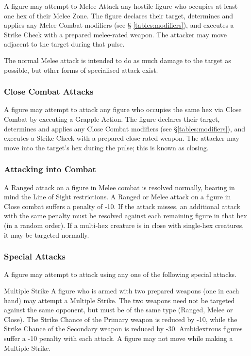 \begin{multicols*}{3}
A figure may attempt to Melee Attack any hostile figure who occupies
at least one hex of their Melee Zone. The figure declares their
target, determines and applies any Melee Combat modifiers (see \S
\ref{tables:modifiers}), and executes a Strike Check with a prepared
melee-rated weapon. The attacker may move adjacent to the target
during that pulse.

The normal Melee attack is intended to do as much damage to the target
as possible, but other forms of specialised attack exist.

\subsubsection{Close Combat Attacks}

A figure may attempt to attack any figure who occupies the same hex
via Close Combat by executing a Grapple Action. The figure declares
their target, determines and applies any Close Combat modifiers (see
\S \ref{tables:modifiers}), and executes a Strike Check with a
prepared close-rated weapon. The attacker may move into the target's
hex during the pulse; this is known as closing.

\subsubsection{Attacking into Combat}

A Ranged attack on a figure in Melee combat is resolved normally,
bearing in mind the Line of Sight restrictions. A Ranged or Melee
attack on a figure in Close combat suffers a penalty of -10. If the
attack misses, an additional attack with the same penalty must be
resolved against each remaining figure in that hex (in a random
order). If a multi-hex creature is in close with single-hex creatures,
it may be targeted normally.

\subsubsection{Special Attacks}

A figure may attempt to attack using any one of the following special
attacks.

\begin{Description}

\item[Multiple Strike] A figure who is armed with two prepared weapons
(one in each hand) may attempt a Multiple Strike. The two weapons need
not be targeted against the same opponent, but must be of the same
type (Ranged, Melee or Close). The Strike Chance of the Primary weapon
is reduced by -10, while the Strike Chance of the Secondary weapon is
reduced by -30. Ambidextrous figures suffer a -10 penalty with each
attack. A figure may not move while making a Multiple Strike.


\end{Description}
\end{multicols*}
